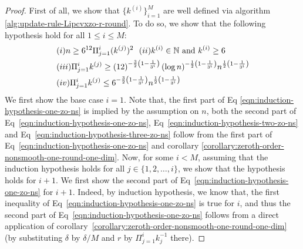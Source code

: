 \begin{proof}
First of all, we show that $\{k^{(i)}\}_{i=1}^M$ are well defined via algorithm 
\ref{alg:update-rule-Lipcvxzo-r-round}. To do so, we show that the following 
hypothesis hold for all $1\leq i\leq M$:
\begin{align}
&(i) n \geq 6^{12} \Pi_{j=1}^i (k^{(j)})^2 ~~
(ii)k^{(i)} \in \mathbb{N}~\text{and}~k^{(i)} \geq 6	\label{eqn:induction-hypothesis-one-zo-ns} \\
&(iii)\Pi_{j=1}^i k^{(j)} \geq \left(12\right)^{-\frac{3}{2}\left(1-\frac{1}{3^i}\right)}
	(\log n)^{-\frac{1}{2}\left(1-\frac{1}{3^i}\right)} n^{\frac{1}{2}\left(1-\frac{1}{3^i}\right)}
\label{eqn:induction-hypothesis-two-zo-ns} \\
&(iv)\Pi_{j=1}^i k^{(j)} \leq 6^{-\frac{3}{2}\left(1-\frac{1}{3^i}\right)}
	n^{\frac{1}{2}\left(1-\frac{1}{3^i}\right)}
\label{eqn:induction-hypothesis-three-zo-ns}
\end{align}
We first show the base case $i=1$. Note that, the first part of Eq
\eqref{eqn:induction-hypothesis-one-zo-ns} is implied by the assumption 
on $n$, both the second part of Eq~\eqref{eqn:induction-hypothesis-one-zo-ns}, 
Eq~\eqref{eqn:induction-hypothesis-two-zo-ns} and 
Eq~\eqref{eqn:induction-hypothesis-three-zo-ns}
 follow from the first part
of Eq~\eqref{eqn:induction-hypothesis-one-zo-ns} and corollary 
\ref{corollary:zeroth-order-nonsmooth-one-round-one-dim}. 
Now, for some $i < M$, assuming that the induction hypothesis holds for 
all $j \in \{1, 2, \ldots, i\}$, we show that the hypothesis holds for $i+1$.  
We first show the second part of Eq~\eqref{eqn:induction-hypothesis-one-zo-ns}
for $i+1$. Indeed, by induction hypothesis, we know that, the first 
inequality of Eq~\eqref{eqn:induction-hypothesis-one-zo-ns} is true for $i$,
and thus the second part of Eq~\eqref{eqn:induction-hypothesis-one-zo-ns}
follows from a direct application of corollary~\ref{corollary:zeroth-order-nonsmooth-one-round-one-dim}
(by substituting $\delta$ by $\delta/M$ and $r$ by $\Pi_{j=1}^{i} k_j^{-1}$ there).

\end{proof}
